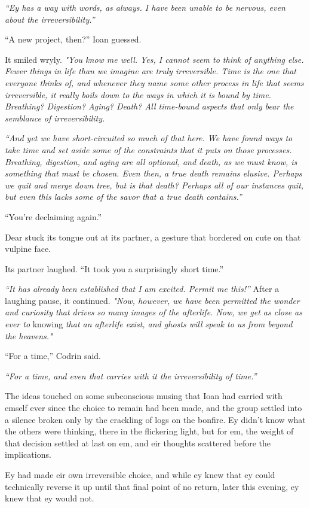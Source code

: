 \emph{``Ey has a way with words, as always. I have been unable to be nervous, even about the irreversibility.''}

``A new project, then?'' Ioan guessed.

It smiled wryly. \emph{"You know me well. Yes, I cannot seem to think of anything else. Fewer things in life than we imagine are truly irreversible. Time is the one that everyone thinks of, and whenever they name some other process in life that seems irreversible, it really boils down to the ways in which it is bound by time. Breathing? Digestion? Aging? Death? All time-bound aspects that only bear the semblance of irreversibility.}

\emph{``And yet we have short-circuited so much of that here. We have found ways to take time and set aside some of the constraints that it puts on those processes. Breathing, digestion, and aging are all optional, and death, as we must know, is something that must be chosen. Even then, a true death remains elusive. Perhaps we quit and merge down tree, but is that death? Perhaps all of our instances quit, but even this lacks some of the savor that a true death contains.''}

``You're declaiming again.''

Dear stuck its tongue out at its partner, a gesture that bordered on cute on that vulpine face.

Its partner laughed. ``It took you a surprisingly short time.''

\emph{``It has already been established that I am excited. Permit me this!''} After a laughing pause, it continued. \emph{"Now, however, we have been permitted the wonder and curiosity that drives so many images of the afterlife. Now, we get as close as ever to} knowing \emph{that an afterlife exist, and ghosts will speak to us from beyond the heavens."}

``For a time,'' Codrin said.

\emph{``For a time, and even that carries with it the irreversibility of time.''}

The ideas touched on some subconscious musing that Ioan had carried with emself ever since the choice to remain had been made, and the group settled into a silence broken only by the crackling of logs on the bonfire. Ey didn't know what the others were thinking, there in the flickering light, but for em, the weight of that decision settled at last on em, and eir thoughts scattered before the implications.

Ey had made eir own irreversible choice, and while ey knew that ey could technically reverse it up until that final point of no return, later this evening, ey knew that ey would not.

